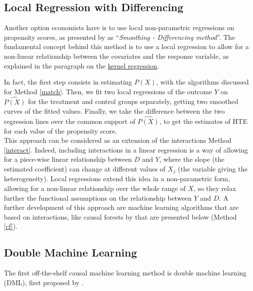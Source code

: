 \documentclass[12pt,a4paper,openright,twoside]{book}
\newcommand{\customref}[2]{\hyperref[#1]{#2}}
\begin{document}
\begin{doublespacing}
\subsection{Local Regression with Differencing} \label{locreg} 
Another option economists have is to use local non-parametric regressions on propensity scores, as presented by \citet{xie2012estimating} as ``\textit{Smoothing - Differencing method}''. The fundamental concept behind this method is to use a local regression to allow for a non-linear relationship between the covariates and the response variable, as explained in the paragraph on the \customref{kernel}{kernel regression}. 

In fact, the first step consists in estimating $P(X)$, with the algorithms discussed for Method \ref{match}. Then, we fit two local regressions of the outcome $Y$ on $\hat{P(X)}$ for the treatment and control groups separately, getting two smoothed curves of the fitted values. Finally, we take the difference between the two regression lines over the common support of $\hat{P(X)}$, to get the estimates of HTE for each value of the propensity score. \\

This approach can be considered as an extension of the interactions Method \ref{interact}. Indeed, including interactions in a linear regression is a way of allowing for a piece-wise linear relationship between $D$ and $Y$, where the slope (the estimated coefficient) can change at different values of $X_j$ (the variable giving the heterogeneity). Local regressions extend this idea in a non-parametric form, allowing for a non-linear relationship over the whole range of $X$, so they relax further the functional assumptions on the relationship between $Y$ and $D$. A further development of this approach are machine learning algorithms that are based on interactions, like causal forests by \citet{wagerathey2018} that are presented below (Method \ref{cf}).


\subsection{Double Machine Learning} \label{dml}

The first off-the-shelf causal machine learning method is double machine learning (DML), first proposed by \citet{chernozhukov2018double}.


\end{doublespacing}
\end{document}
